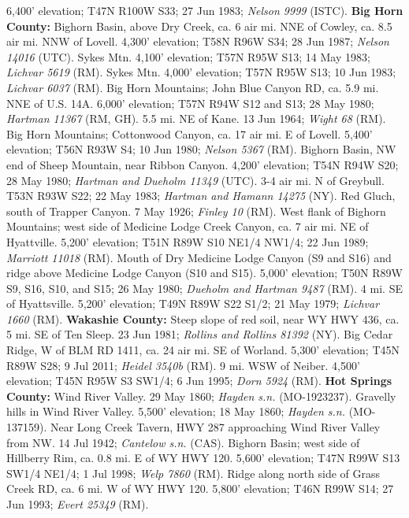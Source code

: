 6,400' elevation; T47N R100W S33; 27 Jun 1983; \textit{Nelson 9999} (ISTC).
  \textbf{Big Horn County:}
Bighorn Basin, above Dry Creek, ca. 6 air mi. NNE of Cowley, ca. 8.5 air mi. NNW
of Lovell. 4,300' elevation; T58N R96W S34; 28 Jun 1987;
\textit{Nelson 14016} (UTC).
Sykes Mtn. 4,100' elevation; T57N R95W S13; 14 May 1983;
\textit{Lichvar 5619} (RM).
Sykes Mtn. 4,000' elevation; T57N R95W S13; 10 Jun 1983;
\textit{Lichvar 6037} (RM).
Big Horn Mountains; John Blue Canyon RD, ca. 5.9 mi. NNE of U.S. 14A.
6,000' elevation; T57N R94W S12 and S13; 28 May 1980;
\textit{Hartman 11367} (RM, GH).
5.5 mi. NE of Kane. 13 Jun 1964; \textit{Wight 68} (RM).
Big Horn Mountains; Cottonwood Canyon, ca. 17 air mi. E of Lovell.
5,400' elevation; T56N R93W S4; 10 Jun 1980; \textit{Nelson 5367} (RM).
Bighorn Basin, NW end of Sheep Mountain, near Ribbon Canyon. 4,200' elevation;
T54N R94W S20; 28 May 1980; \textit{Hartman and Dueholm 11349} (UTC).
3-4 air mi. N of Greybull. T53N R93W S22; 22 May 1983;
\textit{Hartman and Hamann 14275} (NY).
Red Gluch, south of Trapper Canyon. 7 May 1926; \textit{Finley 10} (RM).
West flank of Bighorn Mountains; west side of Medicine Lodge Creek Canyon, ca.
7 air mi. NE of Hyattville. 5,200' elevation; T51N R89W S10 NE1/4 NW1/4;
22 Jun 1989; \textit{Marriott 11018} (RM).
Mouth of Dry Medicine Lodge Canyon (S9 and S16) and ridge above Medicine Lodge
Canyon (S10 and S15). 5,000' elevation; T50N R89W S9, S16, S10, and S15;
26 May 1980; \textit{Dueholm and Hartman 9487} (RM).
4 mi. SE of Hyattsville. 5,200' elevation; T49N R89W S22 S1/2; 21 May 1979;
\textit{Lichvar 1660} (RM).
  \textbf{Wakashie County:}
Steep slope of red soil, near WY HWY 436, ca. 5 mi. SE of Ten Sleep.
23 Jun 1981; \textit{Rollins and Rollins 81392} (NY).
Big Cedar Ridge, W of BLM RD 1411, ca. 24 air mi. SE of Worland.
5,300' elevation; T45N R89W S28; 9 Jul 2011; \textit{Heidel 3540b} (RM).
9 mi. WSW of Neiber. 4,500' elevation; T45N R95W S3 SW1/4; 6 Jun 1995;
\textit{Dorn 5924} (RM).
  \textbf{Hot Springs County:}
Wind River Valley. 29 May 1860; \textit{Hayden s.n.} (MO-1923237).
Gravelly hills in Wind River Valley. 5,500' elevation; 18 May 1860;
\textit{Hayden s.n.} (MO-137159).
Near Long Creek Tavern, HWY 287 approaching Wind River Valley from NW.
14 Jul 1942; \textit{Cantelow s.n.} (CAS).
Bighorn Basin; west side of Hillberry Rim, ca. 0.8 mi. E of WY HWY 120.
5,600' elevation; T47N R99W S13 SW1/4 NE1/4; 1 Jul 1998; \textit{Welp 7860} (RM).
Ridge along north side of Grass Creek RD, ca. 6 mi. W of WY HWY 120.
5,800' elevation; T46N R99W S14; 27 Jun 1993; \textit{Evert 25349} (RM).
